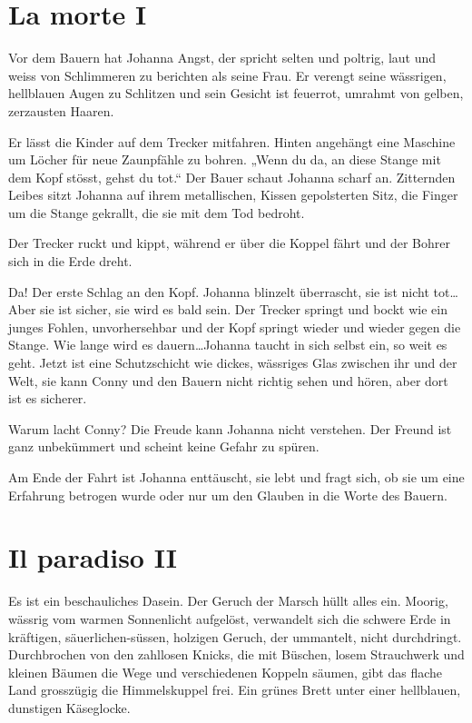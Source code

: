 \documentclass[10pt,titlepage,a5paper]{book}
\begin{document}
\section*{La morte I}


Vor dem Bauern hat Johanna Angst, der spricht selten und poltrig, laut und weiss von Schlimmeren zu berichten als seine Frau. Er verengt seine wässrigen, hellblauen Augen zu Schlitzen und sein Gesicht ist feuerrot, umrahmt von gelben, zerzausten Haaren.

Er lässt die Kinder auf dem Trecker mitfahren. Hinten angehängt eine Maschine um Löcher für neue Zaunpfähle zu bohren. „Wenn du da, an diese Stange mit dem Kopf stösst, gehst du tot.“ Der Bauer schaut Johanna scharf an. Zitternden Leibes sitzt Johanna auf ihrem metallischen, Kissen gepolsterten Sitz, die Finger um die Stange gekrallt, die sie mit dem Tod bedroht.

Der Trecker ruckt und kippt, während er über die Koppel fährt und der Bohrer sich in die Erde dreht.

Da! Der erste Schlag an den Kopf. Johanna blinzelt überrascht, sie ist nicht tot\dots Aber sie ist sicher, sie wird es bald sein. Der Trecker springt und bockt wie ein junges Fohlen, unvorhersehbar und der Kopf springt wieder und wieder gegen die Stange. Wie lange wird es dauern\dots Johanna taucht in sich selbst ein, so weit es geht. Jetzt ist eine Schutzschicht wie dickes, wässriges Glas zwischen ihr und der Welt, sie kann Conny und den Bauern nicht richtig sehen und hören, aber dort ist es sicherer.

Warum lacht Conny? Die Freude kann Johanna nicht verstehen. Der Freund ist ganz unbekümmert und scheint keine Gefahr zu spüren.

Am Ende der Fahrt ist Johanna enttäuscht, sie lebt und fragt sich, ob sie um eine Erfahrung betrogen wurde oder nur um den Glauben in die Worte des Bauern.



\section*{Il paradiso II}



Es ist ein beschauliches Dasein. Der Geruch der Marsch hüllt alles ein. Moorig, wässrig vom warmen Sonnenlicht aufgelöst, verwandelt sich die schwere Erde in kräftigen, säuerlichen-süssen, holzigen Geruch, der ummantelt, nicht durchdringt. Durchbrochen von den zahllosen Knicks, die mit Büschen, losem Strauchwerk und kleinen Bäumen die Wege und verschiedenen Koppeln säumen, gibt das flache Land grosszügig die Himmelskuppel frei. Ein grünes Brett unter einer hellblauen, dunstigen Käseglocke. 
\end{document}
